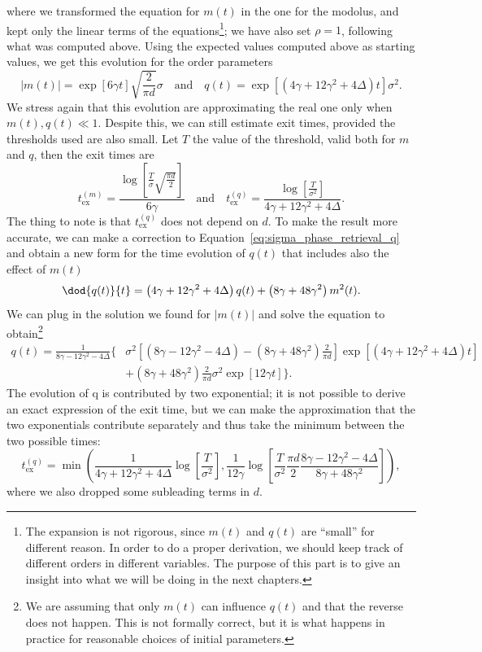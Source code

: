 where we transformed the equation for \(m(t)\) in the one for the modolus,
and kept only the linear terms of the equations\footnote{
  The expansion is not rigorous, since \(m(t)\) and \(q(t)\) are ``small'' for different reason.
  In order to do a proper derivation, we should keep track of different orders in different variables.
  The purpose of this part is to give an insight into what we will be doing in the next chapters.
}; we have also set \(\rho=1\), following what was computed above.
Using the expected values computed above as starting values, we get this evolution for the order parameters
\[
  |m(t)| = \exp{\left[6\gamma t\right]}\sqrt{\frac{2}{\pi d}}\sigma \quad\text{and}\quad
  q(t) = \exp{\left[\left(4 \gamma + 12 \gamma^2 + 4\Delta\right)t\right]}\sigma^2.
\]
We stress again that this evolution are approximating the real one only when \(m(t),q(t)\ll1\).
Despite this, we can still estimate exit times, provided the thresholds used are also small.
Let \(T\) the value of the threshold, valid both for \(m\) and \(q\), then the exit times are
\begin{equation}
  t_\text{ex}^{(m)} = \frac{\log{\left[\frac{T}{\sigma}\sqrt{\frac{\pi d}{2}}\right]}}{6\gamma} \quad\text{and}\quad
  t_\text{ex}^{(q)} = \frac{\log{\left[\frac{T}{\sigma^2}\right]}}{4 \gamma + 12 \gamma^2 + 4\Delta}.
\end{equation}
The thing to note is that \(t_\text{ex}^{(q)}\) does not depend on \(d\).
To make the result more accurate, we can make a correction to Equation~\eqref{eq:sigma_phase_retrieval_q}
and obtain a new form for the time evolution of \(q(t)\) that includes also the effect of \(m(t)\)
\[
  \dod{q{(t)}}{t} = \left(4 \gamma + 12 \gamma^2 + 4\Delta\right) q{(t)} + \left(8\gamma+48\gamma^2\right)m^2{(t)}.
\]
We can plug in the solution we found for \(|m(t)|\) and solve the equation to obtain\footnote{
  We are assuming that only \(m(t)\) can influence \(q(t)\) and that the reverse does not happen.
  This is not formally correct, but it is what happens in practice for reasonable choices of initial parameters.
}
\[\begin{split}
  q{(t)} = \frac{1}{8\gamma-12\gamma^2-4\Delta}\Bigg\{&\sigma^2\left[(8\gamma-12\gamma^2-4\Delta)-\left(8\gamma+48\gamma^2\right)\frac{2}{\pi d}\right]\exp\left[\left(4 \gamma + 12 \gamma^2 + 4\Delta\right)t\right]\\
          &+\left(8\gamma+48\gamma^2\right)\frac{2}{\pi d}\sigma^2 \exp\left[12\gamma t\right]\Bigg\}.
\end{split}\]
The evolution of q is contributed by two exponential;
it is not possible to derive an exact expression of the exit time,
but we can make the approximation that the two exponentials contribute separately
and thus take the minimum between the two possible times:
\[
  t_\text{ex}^{(q)} = \min\left(\frac{1}{4 \gamma + 12 \gamma^2 + 4\Delta}\log{\left[\frac{T}{\sigma^2}\right]},
                                \frac{1}{12\gamma}\log{\left[\frac{T}{\sigma^2}\frac{\pi d}{2}\frac{8\gamma-12\gamma^2-4\Delta}{8\gamma+48\gamma^2}\right]}\right),
\]
where we also dropped some subleading terms in \(d\).

